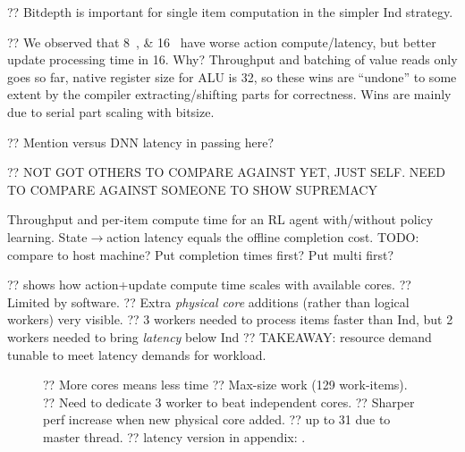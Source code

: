 \documentclass[sigconf,natbib=false]{acmart}
\newcommand{\Indfw}{Ind}
\begin{document}
?? Bitdepth is important for single item computation in the simpler \Indfw{} strategy.

?? We observed that \SIlist{8;16}{\bit} have worse action compute/latency, but better update processing time in \SI{16}{\bit}. Why? Throughput and batching of value reads only goes so far, native register size for ALU is \SI{32}{\bit}, so these wins are ``undone'' to some extent by the compiler extracting/shifting parts  for correctness. Wins are mainly due to serial part scaling with bitsize.

?? Mention versus DNN latency in passing here?

?? NOT GOT OTHERS TO COMPARE AGAINST YET, JUST SELF. NEED TO COMPARE AGAINST SOMEONE TO SHOW SUPREMACY

\begin{table}
	\caption{Throughput and per-item compute time for an RL agent with/without policy learning. State$\rightarrow$action latency equals the offline completion cost. TODO: compare to host machine? Put completion times first? Put multi first?\label{tab:lat-tput}}
\end{table}

??  shows how action+update compute time scales with available cores.
?? Limited by software.
?? Extra \emph{physical core} additions (rather than logical workers) very visible.
?? 3 workers needed to process items faster than \Indfw{}, but 2 workers needed to bring \emph{latency} below \Indfw{}
?? TAKEAWAY: resource demand tunable to meet latency demands for workload.

\begin{figure}
	\caption{?? More cores means less time ?? Max-size work (129 work-items). ?? Need to dedicate 3 worker to beat independent cores. ?? Sharper perf increase when new physical core added. ?? up to 31 due to master thread. ?? latency version in appendix: .\label{fig:vary-core}}
\end{figure}
\end{document}
